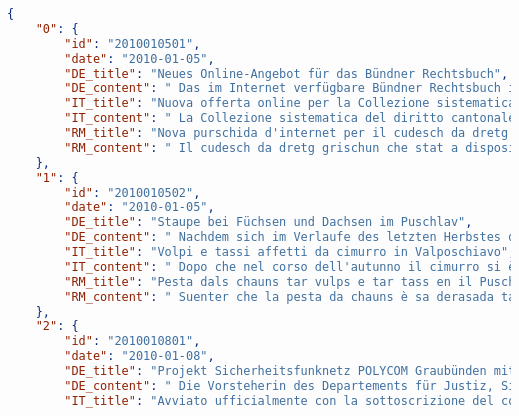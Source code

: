 \begin{lstlisting}[caption={Example for a JSON file containing aligned documents}, captionpos=b, label=lst:json-aligned, language=json]
{
    "0": {
        "id": "2010010501",
        "date": "2010-01-05",
        "DE_title": "Neues Online-Angebot für das Bündner Rechtsbuch",
        "DE_content": " Das im Internet verfügbare Bündner Rechtsbuch ist neu gestaltet worden und enthält neue Funktionalitäten. ...",
        "IT_title": "Nuova offerta online per la Collezione sistematica del diritto cantonale grigionese",
        "IT_content": " La Collezione sistematica del diritto cantonale grigionese disponibile in internet è stata ristrutturata e contiene nuove funzioni. ... ",
        "RM_title": "Nova purschida d'internet per il cudesch da dretg grischun",
        "RM_content": " Il cudesch da dretg grischun che stat a disposiziun en l'internet ha survegnì in nov concept e novas funcziuns. ... "
    },
    "1": {
        "id": "2010010502",
        "date": "2010-01-05",
        "DE_title": "Staupe bei Füchsen und Dachsen im Puschlav",
        "DE_content": " Nachdem sich im Verlaufe des letzten Herbstes die Staupe-Krankheit bei Wildtieren in Nord- und Mittelbünden verbreitete, sind im Laufe der letzten Wochen nun auch im Puschlav bei Füchsen und Dachsen Infektionen mit dem Staupevirus nachgewiesen worden. ... ",
        "IT_title": "Volpi e tassi affetti da cimurro in Valposchiavo",
        "IT_content": " Dopo che nel corso dell'autunno il cimurro si è diffuso tra gli animali selvatici del Grigioni settentrionale e centrale, nelle ultime settimane la presenza del virus è stata rilevata anche tra volpi e tassi della Valposchiavo. ...  ",
        "RM_title": "Pesta dals chauns tar vulps e tar tass en il Puschlav",
        "RM_content": " Suenter che la pesta da chauns è sa derasada tar la selvaschina dal Grischun dal nord e central en il decurs da l'atun passà, èn vegnidas cumprovadas en il decurs da las ultimas emnas ussa er infecziuns cun il virus da questa malsogna tar vulps e tar tass en il Puschlav. ... "
    },
    "2": {
        "id": "2010010801",
        "date": "2010-01-08",
        "DE_title": "Projekt Sicherheitsfunknetz POLYCOM Graubünden mit Vertragsunterzeichnung offiziell gestartet",
        "DE_content": " Die Vorsteherin des Departements für Justiz, Sicherheit und Gesundheit, Regierungsrätin Barbara Janom Steiner, und der Chef des Grenzwachtkorps, Jürg Noth, haben heute in Chur eine Vereinbarung zur Realisierung des Sicherheitsfunknetzes POLYCOM im Kanton unterzeichnet. ... ",
        "IT_title": "Avviato ufficialmente con la sottoscrizione del contratto il progetto di rete radio di sicurezza POLYCOM Grigioni",

\end{lstlisting}
